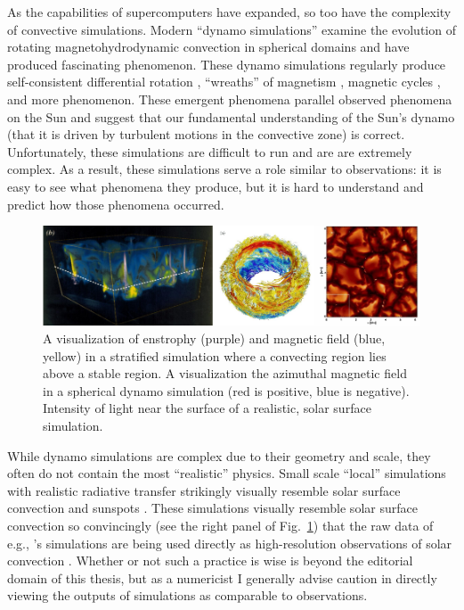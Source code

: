 As the capabilities of supercomputers have expanded, so too have the complexity of convective simulations.
Modern ``dynamo simulations'' examine the evolution of rotating magnetohydrodynamic convection in spherical domains and have produced fascinating phenomenon.
These dynamo simulations regularly produce self-consistent differential rotation \citep{strugarek&all2018}, ``wreaths'' of magnetism \citep[][and visualized in the middle panel of Fig.~\ref{fig:complex_simulations}]{brown&all2010, brown&all2011}, magnetic cycles \citep{brown&all2011}, and more phenomenon.
These emergent phenomena parallel observed phenomena on the Sun and suggest that our fundamental understanding of the Sun's dynamo (that it is driven by turbulent motions in the convective zone) is correct.
Unfortunately, these simulations are difficult to run and are are extremely complex.
As a result, these simulations serve a role similar to observations: it is easy to see what phenomena they produce, but it is hard to understand and predict how those phenomena occurred.

\begin{figure}[t!]
\vspace{0.25cm}
\includegraphics[width=\textwidth]{./figs/intro/complex_simulations.pdf}
\caption[Visualizations of modern simulations of astrophysical convection.]
{
	\citep[left, Fig.~2b of][]{tobias&all1998} A visualization of enstrophy (purple) and magnetic field (blue, yellow) in a stratified simulation where a convecting region lies above a stable region.
	\citep[middle, Fig.~2a of][]{brown&all2011} A visualization the azimuthal magnetic field in a spherical dynamo simulation (red is positive, blue is negative).
	\citep[right, Fig.~6a of][]{rempel2014} Intensity of light near the surface of a realistic, solar surface simulation.
	\label{fig:complex_simulations} 
}
\end{figure}


While dynamo simulations are complex due to their geometry and scale, they often do not contain the most ``realistic'' physics.
Small scale ``local'' simulations with realistic radiative transfer strikingly visually resemble solar surface convection and sunspots \citep{stein&nordlund1998, rempel&all2009, stein&nordlund2012, rempel2014}.
These simulations visually resemble solar surface convection so convincingly (see the right panel of Fig.~\ref{fig:complex_simulations}) that the raw data of e.g., \cite{rempel2014}'s simulations are being used directly as high-resolution observations of solar convection \cite[see e.g.,][and others]{vankooten&cranmer2017, shchukina&trujillo2019}.
Whether or not such a practice is wise is beyond the editorial domain of this thesis, but as a numericist I generally advise caution in directly viewing the outputs of simulations as comparable to observations.

